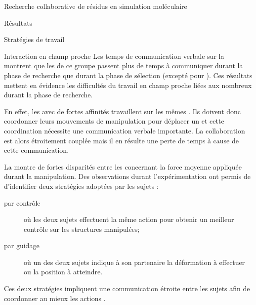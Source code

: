 \documentclass[myfrancais]{mythesis}
\begin{document}
\begin{mychapter}{Recherche collaborative de résidus en simulation moléculaire}
\begin{mysection}{Résultats}
\begin{mysubsection}{Stratégies de travail}
\begin{mysubsubsection}{Interaction en champ proche}
					Les temps de communication verbale sur la  montrent que les  de ce groupe passent plus de temps à communiquer durant la phase de recherche que durant la phase de sélection (excepté pour ).
					Ces résultats mettent en évidence les difficultés du travail en champ proche liées aux nombreux  durant la phase de recherche.

					En effet, les  avec de fortes affinités travaillent sur les mêmes .
					Ils doivent donc coordonner leurs mouvements de manipulation pour déplacer un  et cette coordination nécessite une communication verbale importante.
					La collaboration est alors étroitement couplée mais il en résulte une perte de temps à cause de cette communication.

					La  montre de fortes disparités entre les  concernant la force moyenne appliquée durant la manipulation.
					Des observations durant l'expérimentation ont permis de d'identifier deux stratégies adoptées par les sujets :
					\begin{description}
						\item[par contrôle] où les deux sujets effectuent la même action pour obtenir un meilleur contrôle sur les structures manipulées;
						\item[par guidage] où un des deux sujets indique à son partenaire la déformation à effectuer ou la position à atteindre.
					\end{description}
					Ces deux stratégies impliquent une communication étroite entre les sujets afin de coordonner au mieux les actions .


\end{mysubsubsection}
\end{mysubsection}
\end{mysection}
\end{mychapter}
\end{document}
